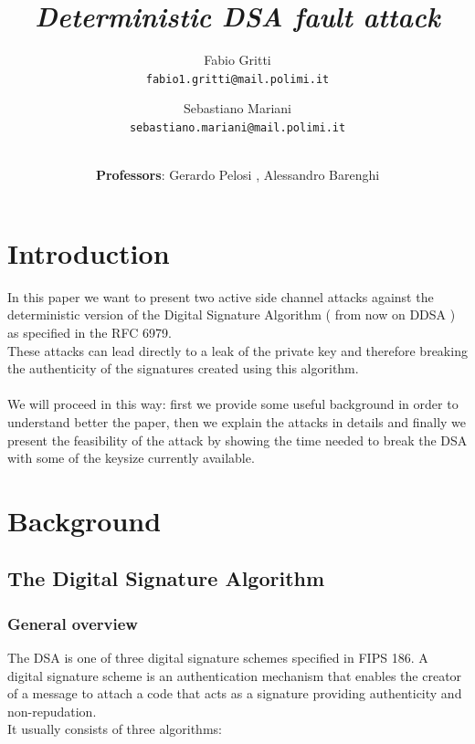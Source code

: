 \documentclass[11pt,english]{article}
\begin{document}
\title{\textit{Deterministic DSA fault attack}}
\author{
  Fabio Gritti\\
  \texttt{fabio1.gritti@mail.polimi.it}
  \and
  Sebastiano Mariani\\
  \texttt{sebastiano.mariani@mail.polimi.it}
  \and \\
  \textbf{Professors}: Gerardo Pelosi , Alessandro Barenghi
}
\date{}
\maketitle

\pagestyle{plain}
\tableofcontents

\section{Introduction}
In this paper we want to present two active side channel attacks against the deterministic version of the Digital Signature Algorithm ( from now on DDSA ) as specified in the RFC 6979\cite{rfc}.\\
These attacks can lead directly to a leak of the private key and therefore breaking the authenticity of the signatures created using this algorithm. \\\\
We will proceed in this way: first we provide some useful background in order to understand better the paper, then we explain the attacks in details and finally we present the feasibility of the attack by showing the time needed to break the DSA with some of the keysize currently available.

\section{Background}

\subsection{The Digital Signature Algorithm}

\subsubsection{General overview}
The DSA is one of three digital signature schemes specified in FIPS 186\cite{fips}. A digital signature scheme is an authentication mechanism that enables the creator of a message to attach a code that acts as a signature providing authenticity and non-repudation. \\It usually consists of three algorithms:
\end{document}
